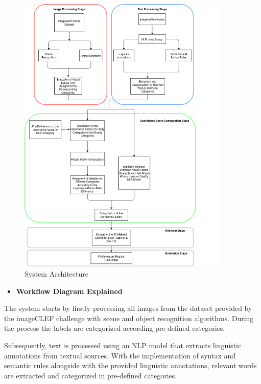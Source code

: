 \begin{figure}[H]
    \centering
    \captionsetup{justification=centering}
    \includegraphics[width = 0.9\textwidth]{Sections/6textprocessing/images/diagram.png}
    \caption{System Architecture}
    \label{fig:testtopic}
  \end{figure}

\newpage

\begin{itemize}
  \item \textbf{Workflow Diagram Explained}
\end{itemize}

The system starts by firstly processing all images from the dataset provided by the imageCLEF challenge with scene and object recognition algorithms. During the process the labels are categorized according pre-defined categories.

Subsequently, text is processed using an NLP model that extracts linguistic annotations from textual sources.  With the implementation of syntax and semantic rules alongside with the provided linguistic annotations, relevant words are extracted and categorized in pre-defined categories. 


